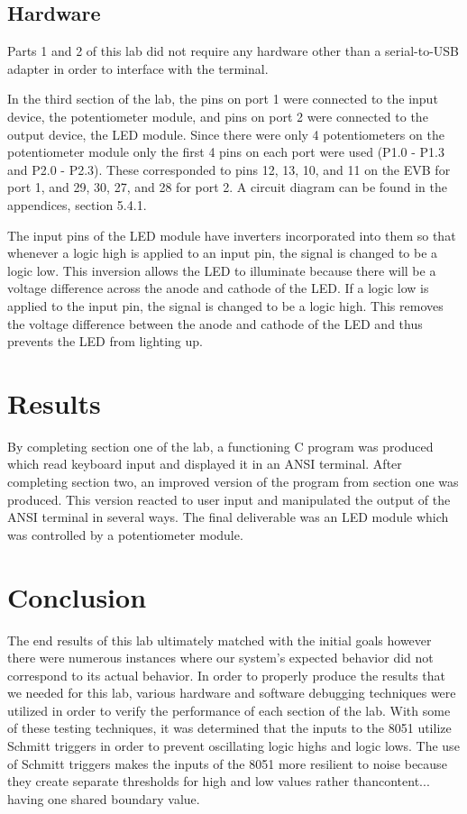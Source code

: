 \documentclass[12pt]{article}
\begin{document}
\subsection{Hardware}

Parts 1 and 2 of this lab did not require any hardware other than a serial-to-USB adapter in order to interface with the terminal.

In the third section of the lab, the pins on port 1 were connected to the input device, the potentiometer module, and pins on port 2 were connected to the output device, the LED module. Since there were only 4 potentiometers on the potentiometer module only the first 4 pins on each port were used (P1.0 - P1.3 and P2.0 - P2.3). These corresponded to pins 12, 13, 10, and 11 on the EVB for port 1, and 29, 30, 27, and 28 for port 2. A circuit diagram can be found in the appendices, section 5.4.1.

The input pins of the LED module have inverters incorporated into them so that whenever a logic high is applied to an input pin, the signal is changed to be a logic low. This inversion allows the LED to illuminate because there will be a voltage difference across the anode and cathode of the LED. If a logic low is applied to the input pin, the signal is changed to be a logic high. This removes the voltage difference between the anode and cathode of the LED and thus prevents the LED from lighting up. 
 
\section{Results}

By completing section one of the lab, a functioning C program was produced which read keyboard input and displayed it in an ANSI terminal. After completing section two, an improved version of the program from section one was produced. This version reacted to user input and manipulated the output of the ANSI terminal in several ways. The final deliverable was an LED module which was controlled by a potentiometer module. 

\section{Conclusion}

The end results of this lab ultimately matched with the initial goals however there were numerous instances where our system’s expected behavior did not correspond to its actual behavior. In order to properly produce the results that we needed for this lab, various hardware and software debugging techniques were utilized in order to verify the performance of each section of the lab. With some of these testing techniques, it was determined that the inputs to the 8051 utilize Schmitt triggers in order to prevent oscillating logic highs and logic lows. The use of Schmitt triggers makes the inputs of the 8051 more resilient to noise because they create separate thresholds for high and low values rather thancontent... having one shared boundary value. 
\end{document}
